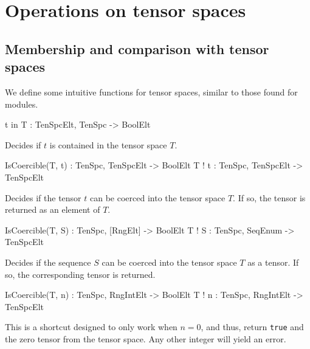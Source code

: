 \section{Operations on tensor spaces}

\subsection{Membership and comparison with tensor spaces}

We define some intuitive functions for tensor spaces, similar to those found for modules.

\begin{intrinsics}
t in T : TenSpcElt, TenSpc -> BoolElt
\end{intrinsics}

Decides if $t$ is contained in the tensor space $T$.

\begin{intrinsics}
IsCoercible(T, t) : TenSpc, TenSpcElt -> BoolElt
T ! t : TenSpc, TenSpcElt -> TenSpcElt
\end{intrinsics}

Decides if the tensor $t$ can be coerced into the tensor space $T$. If so, the tensor is returned as an element of $T$.

\begin{intrinsics}
IsCoercible(T, S) : TenSpc, [RngElt] -> BoolElt
T ! S : TenSpc, SeqEnum -> TenSpcElt
\end{intrinsics}

Decides if the sequence $S$ can be coerced into the tensor space $T$ as a tensor. If so, the corresponding tensor is returned. 

\begin{intrinsics}
IsCoercible(T, n) : TenSpc, RngIntElt -> BoolElt
T ! n : TenSpc, RngIntElt -> TenSpcElt
\end{intrinsics}

This is a shortcut designed to only work when $n=0$, and thus, return {\tt true} and the zero tensor from the tensor space. 
Any other integer will yield an error.

